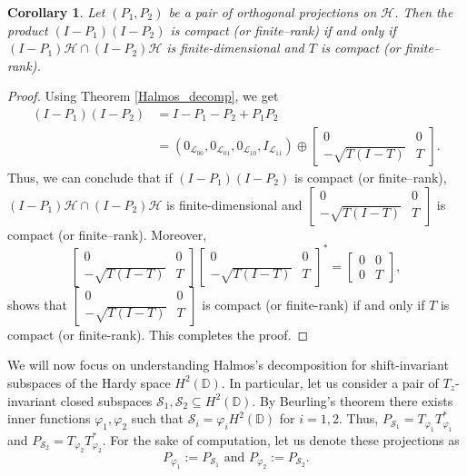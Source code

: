 \documentclass[12pt, a4 paper]{amsart}
\newcommand{\clh}{\mathcal{H}}
\newcommand{\cll}{\mathcal{L}}
\newcommand{\cls}{\mathcal{S}}
\newcommand{\D}{\mathbb{D}}
\theoremstyle{definition}
\theoremstyle{plain}
\newtheorem{cor}[thm]{Corollary}
\theoremstyle{definition}
\numberwithin{equation}{section}
\let\phi=\varphi
\begin{document}
    \begin{cor}\label{K finite}
Let $(P_1, P_2)$ be a pair of orthogonal projections on $\clh$. Then the product $(I - P_1)(I - P_2)$ is compact (or finite--rank) if and only if $(I - P_1) \clh \cap (I - P_2)\clh$ is finite-dimensional and $T$ is compact (or finite--rank).
\end{cor}
\begin{proof}
Using Theorem \ref{Halmos_decomp}, we get
       \begin{equation*} 
 	\begin{split}
       (I-P_1)(I-P_2)
        &=I-P_1-P_2+P_1P_2\\
        &=(0_{\cll_{00}},0_{\cll_{01}},0_{\cll_{10}},I_{\cll_{11}})\oplus \begin{bmatrix}
            0 & 0\\
            -\sqrt{T(I_{}-T)} & T
        \end{bmatrix}.
        \end{split}
       \end{equation*}
Thus, we can conclude that if $(I - P_1)(I - P_2)$ is compact (or finite--rank), $(I - P_1) \clh \cap (I - P_2)\clh$ is finite-dimensional and $\begin{bmatrix}
            0 & 0\\
            -\sqrt{T(I-T)} & T
        \end{bmatrix}$ is compact (or finite--rank). Moreover,
         \[
        \begin{bmatrix}
            0 & 0\\
            -\sqrt{T(I-T)} & T
        \end{bmatrix}\begin{bmatrix}
            0 & 0\\
            -\sqrt{T(I-T)} & T
        \end{bmatrix}^*=\begin{bmatrix}
            0 & 0\\
            0 & T
        \end{bmatrix},
\] 
shows that $\begin{bmatrix}
            0 & 0\\
            -\sqrt{T(I-T)} & T
        \end{bmatrix}$ is compact (or finite-rank) if and only if $T$ is compact (or finite-rank). This completes the proof.
\end{proof}



We will now focus on understanding Halmos's decomposition for shift-invariant subspaces of the Hardy space $H^2(\D)$. In particular, let us consider a pair of $T_z$-invariant closed subspaces $\cls_1, \cls_2 \subseteq H^2(\D)$.  By Beurling's theorem \cite{Beurling} there exists inner functions $\phi_1, \phi_2$ such that $\cls_i = \phi_i H^2(\D)$ for $i=1,2$. Thus, $
P_{\cls_1}  = T_{\phi_1} T_{\phi_1}^*$ and $P_{\cls_2} = T_{\phi_2} T_{\phi_2}^*.$
For the sake of computation, let us denote these projections as $$P_{\phi_1}:= P_{\cls_1} \text{ and } P_{\phi_2}:= P_{\cls_2}. $$
\end{document}
